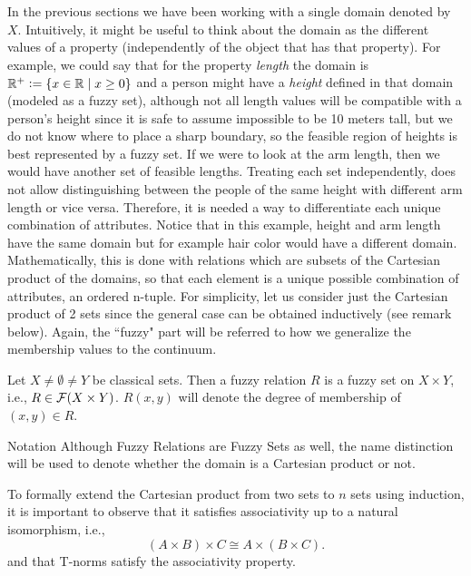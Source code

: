   In the previous sections we have been working with a single domain denoted by $X$. Intuitively, it might be useful to think about the domain as the different values of a property (independently of the object that has that property). For example, we could say that for the property \textit{length} the domain is $\mathbb{R}^+\mathrel{\mathop:}=
  \{x\in\mathbb{R} \mid x \geq 0\}$ and a person might have a \textit{height} defined in that domain (modeled as a fuzzy set), although not all length values will be compatible with a person's height since it is safe to assume impossible to be 10 meters tall, but we do not know where to place a sharp boundary, so the feasible region of heights is best represented by a fuzzy set. If we were to look at the arm length, then we would have another set of feasible lengths. Treating each set independently, does not allow distinguishing between the people of the same height with different arm length or vice versa. Therefore, it is needed a way to differentiate each unique combination of attributes. Notice that in this example, height and arm length have the same domain but for example hair color would have a different domain.\\

  Mathematically, this is done with relations which are subsets of the Cartesian product of the domains, so that each element is a unique possible combination of attributes, an ordered n-tuple. For simplicity, let us consider just the Cartesian product of 2 sets since the general case can be obtained inductively (see remark below). Again, the ``fuzzy" part will be referred to how we generalize the membership values to the continuum.


  \begin{definition}
    Let $X\neq \emptyset \neq Y$ be classical sets. Then a fuzzy relation $R$ is a fuzzy set on $X\times Y$, i.e., $R\in \mathcal{F}(X\times Y)$. $R(x,y)$ will denote the degree of membership of $(x,y) \in R$.
  \end{definition}

  \begin{notation}[label={not:compositionFS}]{Notation}
    Although Fuzzy Relations are Fuzzy Sets as well, the name distinction will be used to denote whether the domain is a Cartesian product or not.
  \end{notation}

  \begin{remark}
    To formally extend the Cartesian product from two sets to \( n \) sets using induction, it is important to observe that it satisfies associativity up to a natural isomorphism, i.e., 
    \[
    (A\times B)\times C \cong A\times (B\times C).
    \]
    and that T-norms satisfy the associativity property.
  \end{remark}

